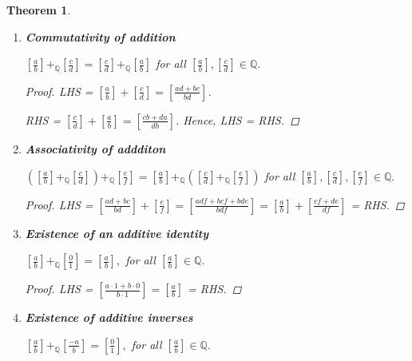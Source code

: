 \documentclass[11pt]{article}
\newcommand{\bbQ}{\mathbb{Q}}
\renewcommand{\_}[1]{\underline{ #1 }}
\newtheorem{theorem}{Theorem}[section]
\theoremstyle{definition}
\numberwithin{equation}{subsection}
\begin{document}
\begin{theorem} 

 \begin{enumerate}
   \item[a)] {\bf Commutativity of addition}
   
   $\displaystyle \left[\frac{a}{b}\right]+_{\bbQ} \left[\frac{c}{d}\right] =\left[\frac{c}{d}\right]+_{\bbQ}\left[\frac{a}{b}\right]$ for all $\displaystyle  \left[\frac{a}{b}\right],\left[\frac{c}{d}\right] \in\bbQ.$

\begin{proof}
LHS = $[\frac{a}{b}] + [\frac{c}{d}] = [\frac{ad+bc}{bd}]$.

RHS = $[\frac{c}{d}] + [\frac{a}{b}] = [\frac{cb+da}{db}]$. Hence, LHS = RHS.

\renewcommand\qedsymbol{QED}
\end{proof}

  \item[b)] {\bf Associativity of addditon}
  
  $\displaystyle \left(\left[\frac{a}{b}\right]+_{\bbQ}\left[\frac{c}{d}\right] \right)+_{\bbQ}\left[\frac{e}{f}\right] = 
  \left[\frac{a}{b}\right]+_{\bbQ}\left( \left[\frac{c}{d}\right] +_{\bbQ} \left[\frac{e}{f}\right]\right) $ for all $\displaystyle \left[\frac{a}{b}\right],\left[\frac{c}{d}\right] , \left[\frac{e}{f}\right]\in \bbQ.$ 

\begin{proof}
LHS = $[\frac{ad+bc}{bd}] + [\frac{e}{f}] = [\frac{adf+bcf+bde}{bdf}] = [\frac{a}{b}] + [\frac{cf+de}{df}]$ = RHS.

\renewcommand\qedsymbol{QED}
\end{proof}

  \item[c)] {\bf Existence of an additive identity}
  
  $\displaystyle \left[\frac{a}{b}\right]+_{\bbQ}\left[\frac{0}{1}\right]=\left[\frac{a}{b}\right],$ for all $\displaystyle \left[\frac{a}{b}\right]\in\bbQ.$

\begin{proof}
LHS = $[\frac{a \cdot 1 + b \cdot 0}{b \cdot 1}] = [\frac{a}{b}]$ = RHS.

\renewcommand\qedsymbol{QED}
\end{proof}
  
  \item[d)] {\bf Existence of additive inverses}
  
  $\displaystyle \left[\frac{a}{b}\right]+_{\bbQ}\left[\frac{-a}{b}\right]=\left[\frac{0}{1}\right],$ for all $\displaystyle \left[\frac{a}{b}\right] \in \bbQ.$


\end{enumerate}
\end{theorem}
\end{document}
